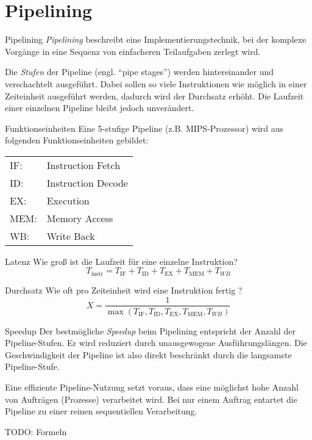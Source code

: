 
\section{Pipelining}

\begin{defi}{Pipelining}
    \emph{Pipelining} beschreibt eine Implementierungstechnik, bei der komplexe Vorgänge in eine Sequenz von einfacheren Teilaufgaben zerlegt wird.
    
    Die \emph{Stufen} der Pipeline (engl. \enquote{pipe stages}) werden hintereinander und verschachtelt ausgeführt.
    Dabei sollen so viele Instruktionen wie möglich in einer Zeiteinheit ausgeführt werden, dadurch wird der Durchsatz erhöht.
    Die Laufzeit einer einzelnen Pipeline bleibt jedoch unverändert.
\end{defi}

\begin{defi}[Pipelining]{Funktionseinheiten}
    Eine 5-stufige Pipeline (z.B. MIPS-Prozessor) wird aus folgenden Funktionseinheiten gebildet:
    \begin{center}
        \begin{tabular}{ll}
            IF:  & Instruction Fetch  \\
            ID:  & Instruction Decode \\
            EX:  & Execution          \\
            MEM: & Memory Access      \\
            WB:  & Write Back         \\
        \end{tabular}
    \end{center}
\end{defi}

\begin{defi}[Pipelining]{Latenz}
    Wie groß ist die Laufzeit für eine einzelne Instruktion?
    \[T_\text{instr} = T_\text{IF} + T_\text{ID} + T_\text{EX} + T_\text{MEM} + T_{WB}\]
\end{defi}

\begin{defi}[Pipelining]{Durchsatz}
    Wie oft pro Zeiteinheit wird eine Instruktion fertig ?
    \[X = \frac{1}{\max(T_\text{IF}, T_\text{ID}, T_\text{EX}, T_\text{MEM}, T_{WB})}\]
\end{defi}

\begin{defi}[Pipelining]{Speedup}
    Der bestmögliche \emph{Speedup} beim Pipelining entspricht der Anzahl der Pipeline-Stufen.
    Er wird reduziert durch unausgewogene Ausführungslängen.
    Die Geschwindigkeit der Pipeline ist also direkt beschränkt durch die langsamste Pipeline-Stufe.
    
    Eine effiziente Pipeline-Nutzung setzt voraus, dass eine möglichst hohe Anzahl von Aufträgen (Prozesse) verarbeitet wird.
    Bei nur einem Auftrag entartet die Pipeline zu einer reinen sequentiellen Verarbeitung.
    
    TODO: Formeln
\end{defi}

